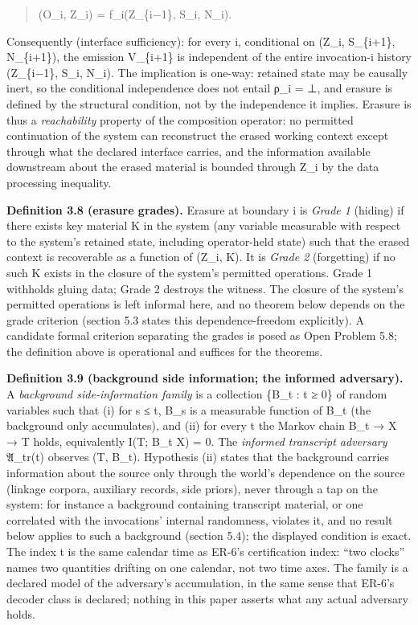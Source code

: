 \documentclass[
  11pt,
]{article}
\begin{document}
\begin{quote}
(O\_i, Z\_i) = f\_i(Z\_\{i−1\}, S\_i, N\_i).
\end{quote}

Consequently (interface sufficiency): for every i, conditional on (Z\_i,
S\_\{i+1\}, N\_\{i+1\}), the emission V\_\{i+1\} is independent of the
entire invocation-i history (Z\_\{i−1\}, S\_i, N\_i). The implication is
one-way: retained state may be causally inert, so the conditional
independence does not entail ρ\_i = ⊥, and erasure is defined by the
structural condition, not by the independence it implies. Erasure is
thus a \emph{reachability} property of the composition operator: no
permitted continuation of the system can reconstruct the erased working
context except through what the declared interface carries, and the
information available downstream about the erased material is bounded
through Z\_i by the data processing inequality.

\textbf{Definition 3.8 (erasure grades).} Erasure at boundary i is
\emph{Grade 1} (hiding) if there exists key material K in the system
(any variable measurable with respect to the system's retained state,
including operator-held state) such that the erased context is
recoverable as a function of (Z\_i, K). It is \emph{Grade 2}
(forgetting) if no such K exists in the closure of the system's
permitted operations. Grade 1 withholds gluing data; Grade 2 destroys
the witness. The closure of the system's permitted operations is left
informal here, and no theorem below depends on the grade criterion
(section 5.3 states this dependence-freedom explicitly). A candidate
formal criterion separating the grades is posed as Open Problem 5.8; the
definition above is operational and suffices for the theorems.

\textbf{Definition 3.9 (background side information; the informed
adversary).} A \emph{background side-information family} is a collection
\{B\_t : t ≥ 0\} of random variables such that (i) for s ≤ t, B\_s is a
measurable function of B\_t (the background only accumulates), and (ii)
for every t the Markov chain B\_t → X → T holds, equivalently I(T; B\_t
\textbar{} X) = 0. The \emph{informed transcript adversary} 𝔄\_tr(t)
observes (T, B\_t). Hypothesis (ii) states that the background carries
information about the source only through the world's dependence on the
source (linkage corpora, auxiliary records, side priors), never through
a tap on the system: for instance a background containing transcript
material, or one correlated with the invocations' internal randomness,
violates it, and no result below applies to such a background (section
5.4); the displayed condition is exact. The index t is the same calendar
time as ER-6's certification index: ``two clocks'' names two quantities
drifting on one calendar, not two time axes. The family is a declared
model of the adversary's accumulation, in the same sense that ER-6's
decoder class is declared; nothing in this paper asserts what any actual
adversary holds.
\end{document}
